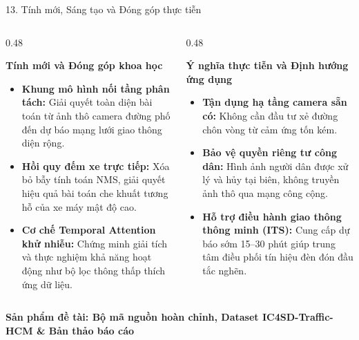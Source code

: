 \documentclass[aspectratio=169,10pt]{beamer}
\newcommand{\badge}[2]{\colorbox{#1!15}{\textcolor{#1}{\textbf{\scriptsize #2}}}}
\begin{document}
\begin{frame}{13. Tính mới, Sáng tạo và Đóng góp thực tiễn}
  \begin{columns}[T]
    \begin{column}{0.48\textwidth}
      \begin{block}{\textbf{Tính mới và Đóng góp khoa học}}
        \scriptsize
        \begin{itemize}
          \item \textbf{Khung mô hình nối tầng phân tách:} Giải quyết toàn diện bài toán từ ảnh thô camera đường phố đến dự báo mạng lưới giao thông diện rộng.
          \item \textbf{Hồi quy đếm xe trực tiếp:} Xóa bỏ bẫy tính toán NMS, giải quyết hiệu quả bài toán che khuất tương hỗ của xe máy mật độ cao.
          \item \textbf{Cơ chế Temporal Attention khử nhiễu:} Chứng minh giải tích và thực nghiệm khả năng hoạt động như bộ lọc thông thấp thích ứng dữ liệu.
        \end{itemize}
      \end{block}
    \end{column}

    \begin{column}{0.48\textwidth}
      \begin{exampleblock}{\textbf{Ý nghĩa thực tiễn và Định hướng ứng dụng}}
        \scriptsize
        \begin{itemize}
          \item \textbf{Tận dụng hạ tầng camera sẵn có:} Không cần đầu tư xẻ đường chôn vòng từ cảm ứng tốn kém.
          \item \textbf{Bảo vệ quyền riêng tư công dân:} Hình ảnh người dân được xử lý và hủy tại biên, không truyền ảnh thô qua mạng công cộng.
          \item \textbf{Hỗ trợ điều hành giao thông thông minh (ITS):} Cung cấp dự báo sớm 15--30 phút giúp trung tâm điều phối tín hiệu đèn đón đầu tắc nghẽn.
        \end{itemize}
      \end{exampleblock}
    \end{column}
  \end{columns}
  \vskip 4pt
  \centering
  \badge{ptitgreen}{\textbf{Sản phẩm đề tài: Bộ mã nguồn hoàn chỉnh, Dataset IC4SD-Traffic-HCM \& Bản thảo báo cáo}}
\end{frame}
\end{document}
